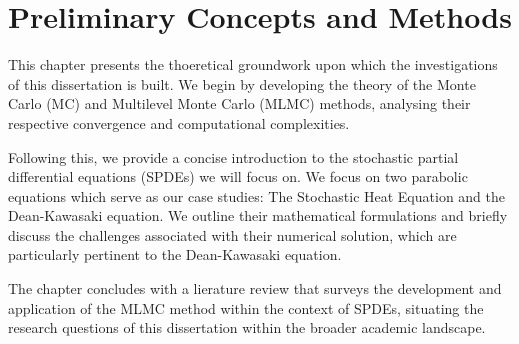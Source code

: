 \chapter{Preliminary Concepts and Methods}\label{chap:preliminary}

This chapter presents the thoeretical groundwork upon which the
investigations of this dissertation is built. We begin by developing the theory 
of the Monte Carlo (MC) and Multilevel Monte Carlo (MLMC) methods, analysing their 
respective convergence and computational complexities. 

Following this, we provide a concise introduction to the stochastic partial 
differential equations (SPDEs) we will focus on. We focus on two parabolic 
equations which serve as our case studies: The Stochastic Heat Equation 
and the Dean-Kawasaki equation. We outline their mathematical formulations and briefly 
discuss the challenges associated with their numerical solution, which are particularly 
pertinent to the Dean-Kawasaki equation.

The chapter concludes with a lierature review that surveys the development and application 
of the MLMC method within the context of SPDEs, situating the research questions of this 
dissertation within the broader academic landscape.




